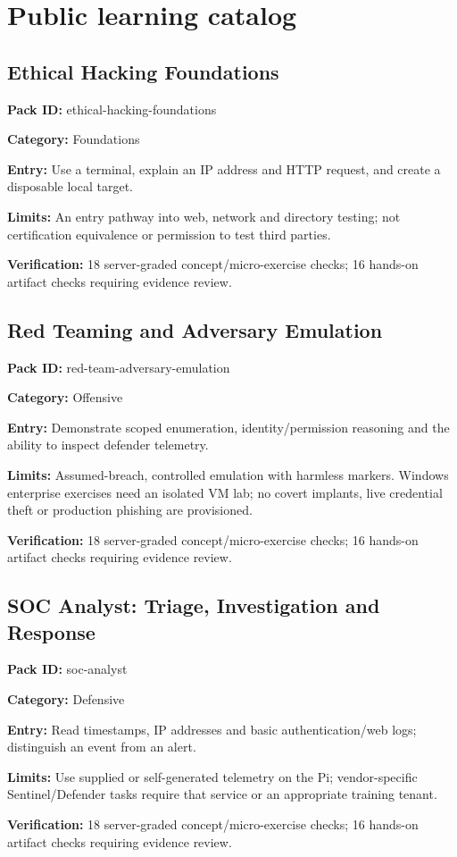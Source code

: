 \section{Public learning catalog}\label{public-catalog}
\subsection{Ethical Hacking Foundations}
\noindent\textbf{Pack ID:} ethical-hacking-foundations\par
\noindent\textbf{Category:} Foundations\par
\noindent\textbf{Entry:} Use a terminal, explain an IP address and HTTP request, and create a disposable local target.\par
\noindent\textbf{Limits:} An entry pathway into web, network and directory testing; not certification equivalence or permission to test third parties.\par
\noindent\textbf{Verification:} 18 server-graded concept/micro-exercise checks; 16 hands-on artifact checks requiring evidence review.\par
\subsection{Red Teaming and Adversary Emulation}
\noindent\textbf{Pack ID:} red-team-adversary-emulation\par
\noindent\textbf{Category:} Offensive\par
\noindent\textbf{Entry:} Demonstrate scoped enumeration, identity/permission reasoning and the ability to inspect defender telemetry.\par
\noindent\textbf{Limits:} Assumed-breach, controlled emulation with harmless markers. Windows enterprise exercises need an isolated VM lab; no covert implants, live credential theft or production phishing are provisioned.\par
\noindent\textbf{Verification:} 18 server-graded concept/micro-exercise checks; 16 hands-on artifact checks requiring evidence review.\par
\subsection{SOC Analyst: Triage, Investigation and Response}
\noindent\textbf{Pack ID:} soc-analyst\par
\noindent\textbf{Category:} Defensive\par
\noindent\textbf{Entry:} Read timestamps, IP addresses and basic authentication/web logs; distinguish an event from an alert.\par
\noindent\textbf{Limits:} Use supplied or self-generated telemetry on the Pi; vendor-specific Sentinel/Defender tasks require that service or an appropriate training tenant.\par
\noindent\textbf{Verification:} 18 server-graded concept/micro-exercise checks; 16 hands-on artifact checks requiring evidence review.\par
